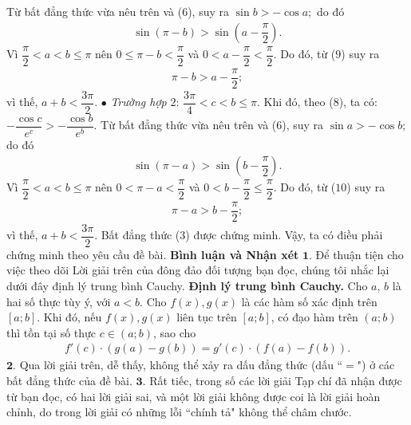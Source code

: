 \begin{multicols}{2}
	\vskip 0.05cm
	Từ bất đẳng thức vừa nêu trên và ($6$), suy ra $\sin b >  - \cos a;$  do đó
	\begin{align*}
		\sin \left( {\pi  - b} \right) > \sin \left( {a - \dfrac{\pi }{2}} \right). \tag{$9$}
	\end{align*}
	Vì $\dfrac{\pi }{2} < a < b \le \pi $ nên $0 \le \pi  - b < \dfrac{\pi }{2}$  và  $0 < a - \dfrac{\pi }{2} < \dfrac{\pi }{2}.$ Do đó, từ ($9$) suy ra
	\begin{align*}
		\pi  - b > a - \dfrac{\pi }{2};
	\end{align*}
	vì thế, $a + b < \dfrac{{3\pi }}{2}.$
	\vskip 0.05cm  
	$\bullet$ \textit{Trường hợp} $2$:  $\dfrac{{3\pi }}{4} < c < b \le \pi.$
	\vskip 0.05cm 
	Khi đó, theo ($8$), ta có:
		$- \dfrac{{\cos c}}{{{e^c}}} >  - \dfrac{{\cos b}}{{{e^b}}}.$
	\vskip 0.05cm
	Từ bất đẳng thức vừa nêu trên và ($6$), suy ra  $\sin a >  - \cos b;$ do đó
	\begin{align*}
		\sin \left( {\pi  - a} \right) > \sin \left( {b - \dfrac{\pi }{2}} \right). \tag{$10$}
	\end{align*}
	Vì $\dfrac{\pi }{2} < a < b \le \pi $  nên  $0 < \pi  - a < \dfrac{\pi }{2}$ và  $0 < b - \dfrac{\pi }{2} \le \dfrac{\pi }{2}.$ Do đó, từ ($10$) suy ra
	\begin{align*}
		\pi  - a > b - \dfrac{\pi }{2};
	\end{align*}
	vì thế,  $a + b < \dfrac{{3\pi }}{2}$.
	\vskip 0.05cm 
	Bất đẳng thức ($3$) được chứng minh.
	\vskip 0.05cm
	Vậy, ta có điều phải chứng minh theo yêu cầu đề bài.
	\vskip 0.05cm
	\textbf{\color{thachthuctoanhoc}Bình luận và Nhận xét}
	\vskip 0.05cm
	$\pmb{1.}$ Để thuận tiện cho việc theo dõi Lời giải trên của đông đảo đối tượng bạn đọc, chúng tôi nhắc lại dưới đây định lý trung bình Cauchy.
	\vskip 0.05cm
	\textbf{\color{thachthuctoanhoc}Định lý trung bình Cauchy.} Cho $a$, $b$ là hai số thực tùy ý, với $a < b$. Cho $f(x), g(x)$ là các hàm số xác định trên $[a;b]$.  Khi đó, nếu  $f(x), g(x)$  liên tục trên $[a;b]$, có đạo hàm trên  $(a;b)$ thì tồn tại số thực $c \in (a;b)$,  sao cho
	\begin{align*}
		f'\left( c \right) \!\cdot\! \left( {g\left( a \right) \!-\! g\left( b \right)} \right) \!=\! g'\left( c \right) \!\cdot\! \left( {f\left( a \right) \!-\! f\left( b \right)} \right).
	\end{align*}
	$\pmb{2.}$ Qua lời giải trên, dễ thấy, không thể xảy ra dấu đẳng thức (dấu ``$=$") ở các bất đẳng thức của đề bài.
	\vskip 0.05cm
	$\pmb{3.}$ Rất tiếc, trong số các lời giải Tạp chí đã nhận được từ bạn đọc, có hai lời giải sai, và một lời giải không được coi là lời giải hoàn chỉnh, do trong lời giải có những lỗi ``chính tả" không thể châm chước. 

\end{multicols}
